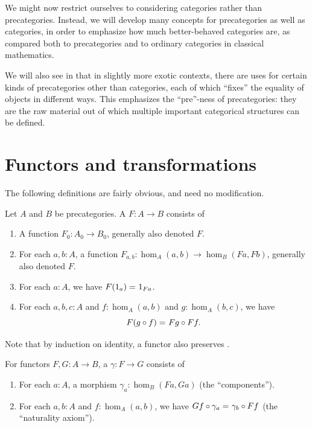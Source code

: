 We might now restrict ourselves to considering categories rather than precategories.
Instead, we will develop many concepts for precategories as well as categories, in order to emphasize how much better-behaved categories are, as compared both to precategories and to ordinary categories in classical mathematics.

We will also see in  that in slightly more exotic contexts, there are uses for certain kinds of precategories other than categories, each of which ``fixes'' the equality of objects in different ways.
This emphasizes the ``pre''-ness of precategories: they are the raw material out of which multiple important categorical structures can be defined.


\section{Functors and transformations}
\label{sec:transfors}

The following definitions are fairly obvious, and need no modification.

\begin{defn}\label{ct:functor}
  Let $A$ and $B$ be precategories.
  A 
  $F:A\to B$ consists of
  \begin{enumerate}
  \item A function $F_0:A_0\to B_0$, generally also denoted $F$.
  \item For each $a,b:A$, a function $F_{a,b}:\hom_A(a,b) \to \hom_B(Fa,Fb)$, generally also denoted $F$.
  \item For each $a:A$, we have $F(1_a) =_{} 1_{Fa}$.
  \item For each $a,b,c:A$ and $f:\hom_A(a,b)$ and $g:\hom_A(b,c)$, we have
    \[F(g\circ f) =_{} Fg\circ Ff.\]\label{ct:functor:comp}
  \end{enumerate}
\end{defn}

Note that by induction on identity, a functor also preserves \idtoiso.

\begin{defn}\label{ct:nattrans}
  For functors $F,G:A\to B$, a 
  $\gamma:F\to G$ consists of
  \begin{enumerate}
  \item For each $a:A$, a morphism $\gamma_a:\hom_B(Fa,Ga)$ (the ``components'').
  \item For each $a,b:A$ and $f:\hom_A(a,b)$, we have $Gf\circ \gamma_a =_{} \gamma_b\circ Ff$ (the ``naturality axiom'').
  \end{enumerate}
\end{defn}

